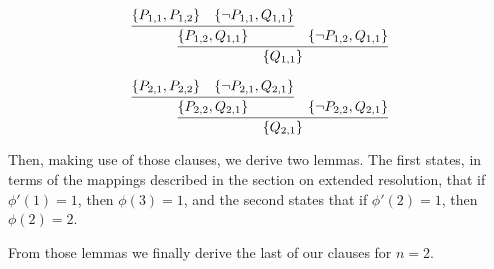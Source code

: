 \begin{appendices}
\[
\infer{\{Q_{1,1}\}}{
  \infer{\{P_{1,2},Q_{1,1}\}}{
    \{P_{1,1},P_{1,2}\}
    &
    \{\neg P_{1,1},Q_{1,1}\}
  }
  &
  \{\neg P_{1,2}, Q_{1,1}\}
}
\]

\[
\infer{\{Q_{2,1}\}}{
  \infer{\{P_{2,2},Q_{2,1}\}}{
    \{P_{2,1},P_{2,2}\}
    &
    \{\neg P_{2,1},Q_{2,1}\}
  }
  &
  \{\neg P_{2,2}, Q_{2,1}\}
}
\]

Then, making use of those clauses, we derive two lemmas. The first states, in terms of the mappings described in the section on extended resolution, that if $\phi'(1) = 1$, then $\phi(3) = 1$, and the second states that if $\phi'(2) = 1$, then $\phi(2) = 2$.



From those lemmas we finally derive the last of our clauses for $n=2$.


\end{appendices}
